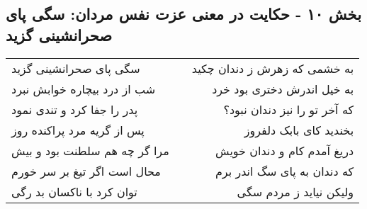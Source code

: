 \begin{center}
\section*{بخش ۱۰ - حکایت در معنی عزت نفس مردان: سگی پای صحرانشینی گزید}
\label{sec:010}
\begin{longtable}{l p{0.5cm} r}
سگی پای صحرانشینی گزید
&&
به خشمی که زهرش ز دندان چکید
\\
شب از درد بیچاره خوابش نبرد
&&
به خیل اندرش دختری بود خرد
\\
پدر را جفا کرد و تندی نمود
&&
که آخر تو را نیز دندان نبود؟
\\
پس از گریه مرد پراکنده روز
&&
بخندید کای بابک دلفروز
\\
مرا گر چه هم سلطنت بود و بیش
&&
دریغ آمدم کام و دندان خویش
\\
محال است اگر تیغ بر سر خورم
&&
که دندان به پای سگ اندر برم
\\
توان کرد با ناکسان بد رگی
&&
ولیکن نیاید ز مردم سگی
\\
\end{longtable}
\end{center}
